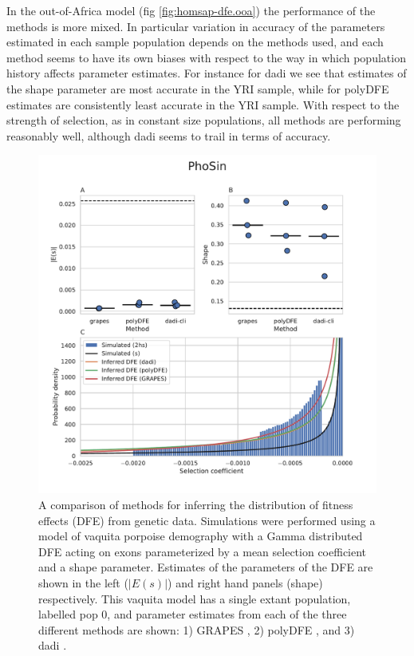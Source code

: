 \documentclass[hidelinks]{article}
\begin{document}
    In the out-of-Africa model (fig \ref{fig:homsap-dfe.ooa}) the performance of the methods is more mixed. 
    In particular variation in accuracy of the parameters estimated in each
    sample population depends on the methods used, and each method seems to 
    have its own biases with respect to the way in which population history 
    affects parameter estimates. For instance for dadi we see that estimates of 
    the shape parameter are most accurate in the YRI sample, while for polyDFE
    estimates are consistently least accurate in the YRI sample. 
    With respect to the strength of selection, as in constant size populations,
    all methods are performing reasonably well, although dadi seems to
    trail in terms of accuracy. 


    \begin{figure}
        \centering
        \includegraphics[width=\textwidth]{figures/PhoSin/Vaquita2Epoch_1R22/PhoSin_Vaquita2Epoch_1R22_Gamma_R22_Phocoena_sinus.mPhoSin1.pri.110_exons_DFE_plot.pdf}
        \caption{
        \label{fig:vaquita-dfe}
        A comparison of methods for inferring the distribution of fitness effects (DFE) from genetic data.
        Simulations were performed using a model of vaquita porpoise demography \citep{robinson2022critically} with a Gamma distributed DFE
        acting on exons parameterized by a mean selection coefficient and a shape parameter. Estimates of the 
        parameters of the DFE are shown in the left ($\lvert E(s) \rvert $) and right hand panels (shape) respectively.
        This vaquita model has a single extant population, labelled pop 0, and parameter estimates from each
        of the three different methods are shown: 1) GRAPES \cite{galtier2016adaptive}, 2) polyDFE \citep{tataru2020polydfe},
        and 3) dadi \citep{gutenkunst2009inferring}.}
    \end{figure}
    
\end{document}
